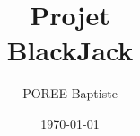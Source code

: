 \newcommand{\VRule}{\rule{5cm}{.5mm}}
\newcommand{\blap}[1]{\vbox to 0pt{#1\vss}}


\newcommand\AtUpperLeftCorner[3]{%
	\put(\LenToUnit{#1},\LenToUnit{\dimexpr\paperheight-#2}){\blap{#3}}%
}
\newcommand\AtUpperRightCorner[3]{%
	\put(\LenToUnit{\dimexpr\paperwidth-#1},\LenToUnit{\dimexpr\paperheight-#2}){\blap{\llap{#3}}}%
}	


\title{\LARGE{Projet\\ BlackJack}}
\author{\textsc{POREE} Baptiste}
\newcommand{\ecole}[1]{\LARGE{Independant}}%
\newcommand{\anneUniver}[1]{\large{Année de Céation du Projet #1}}%
\newcommand{\diplome}[1]{\large{#1}}%
\date{\today}
\makeatletter
